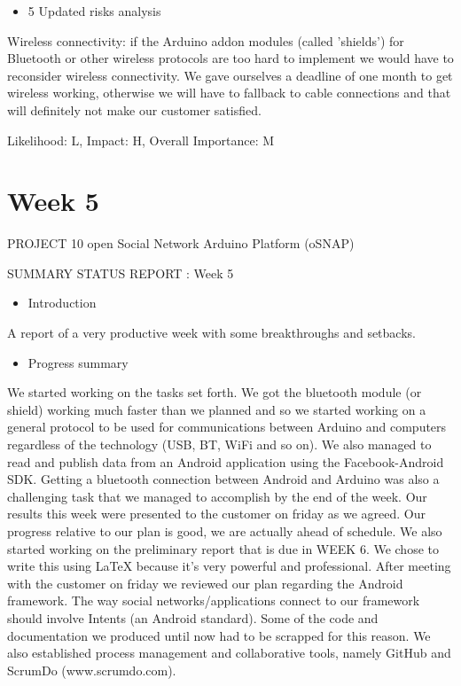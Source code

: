 \begin{itemize}
\item 5 Updated risks analysis
\end{itemize}
Wireless connectivity: if the Arduino addon modules (called 'shields') for Bluetooth or other
wireless protocols are too hard to implement we would have to reconsider wireless connectivity.
We gave ourselves a deadline of one month to get wireless working, otherwise we will have to
fallback to cable connections and that will definitely not make our customer satisfied.

Likelihood: L, Impact: H, Overall Importance: M

\section{Week 5}

PROJECT 10 open Social Network Arduino Platform (oSNAP)

SUMMARY STATUS REPORT : Week 5

\begin{itemize}
\item Introduction
\end{itemize}
A report of a very productive week with some breakthroughs and setbacks.

\begin{itemize}
\item Progress summary
\end{itemize}
We started working on the tasks set forth. We got the bluetooth module (or shield) 
working much faster than we planned and so we started working on a general protocol
to be used for communications between Arduino and computers regardless 
of the technology (USB, BT, WiFi and so on). We also managed to read and publish
data from an Android application using the Facebook-Android SDK. Getting a bluetooth
connection between Android and Arduino was also a challenging task that we managed
to accomplish by the end of the week. Our results this week were presented to the customer
on friday as we agreed. Our progress relative to our plan is good, we are actually ahead of
schedule. We also started working on the preliminary report that is due in WEEK 6.
We chose to write this using LaTeX because it's very powerful and professional.
After meeting with the customer on friday we reviewed our plan regarding the Android framework.
The way social networks/applications connect to our framework should involve
Intents (an Android standard). Some of the code and documentation we produced until
now had to be scrapped for this reason. We also established process management and collaborative
tools, namely GitHub and ScrumDo (www.scrumdo.com).

